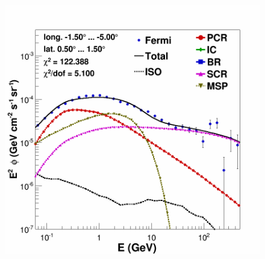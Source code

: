 \begin{figure}[h]
\begin{minipage}[h]{0.45\textwidth}
  \label{fig:MSPonly_chi2Distribution}
  \end{minipage}
  \hfill
  \begin{minipage}[h]{0.45\textwidth}
  	\centering
	\includegraphics[width=1\linewidth]{pic/results/MSPonly_CMZ.png}
  	\label{fig:MSP_only_CMZ}
  \end{minipage}
  \label{fig:Excess_comp_comparison}
\end{figure}



